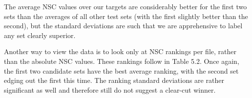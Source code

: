 \documentclass[12pt]{report} 	%
\numberwithin{figure}{chapter}
\numberwithin{table}{chapter}
\numberwithin{equation}{chapter}
\begin{document}
\begin{flushleft}
The average NSC values over our targets are considerably better for the first two sets than the averages of all other test sets (with the first slightly better than the second), but the standard deviations are such that we are apprehensive to label any set clearly superior.

Another way to view the data is to look only at NSC rankings per file, rather than the absolute NSC values. These rankings follow in Table 5.2.
Once again, the first two candidate sets have the best average ranking, with the second set edging out the first this time. The ranking standard deviations are rather significant as well and therefore still do not suggest a clear-cut winner. 


\end{flushleft}
\end{document}
